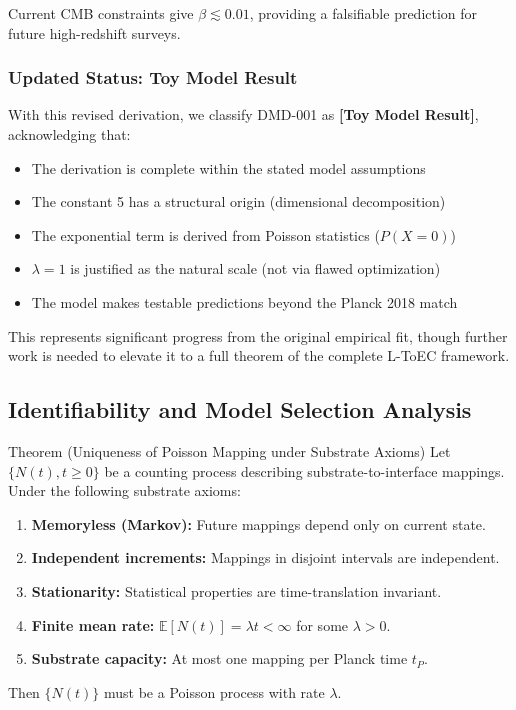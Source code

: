 \documentclass[11pt,titlepage]{article}
\begin{document}
Current CMB constraints give $\beta \lesssim 0.01$, providing a falsifiable prediction for future high-redshift surveys.

\subsubsection{Updated Status: Toy Model Result}
With this revised derivation, we classify DMD-001 as \textbf{[Toy Model Result]}, acknowledging that:
\begin{itemize}
    \item The derivation is complete within the stated model assumptions
    \item The constant 5 has a structural origin (dimensional decomposition)
    \item The exponential term is derived from Poisson statistics ($P(X=0)$)
    \item $\lambda = 1$ is justified as the natural scale (not via flawed optimization)
    \item The model makes testable predictions beyond the Planck 2018 match
\end{itemize}

This represents significant progress from the original empirical fit, though further work is needed to elevate it to a full theorem of the complete L-ToEC framework.


\subsection{Identifiability and Model Selection Analysis}

\begin{mytheorem}{Theorem (Uniqueness of Poisson Mapping under Substrate Axioms)}
\label{thm:poisson-uniqueness}
Let $\{N(t), t \geq 0\}$ be a counting process describing substrate-to-interface mappings. Under the following substrate axioms:
\begin{enumerate}[label=(A\arabic*)]
    \item \textbf{Memoryless (Markov):} Future mappings depend only on current state.
    \item \textbf{Independent increments:} Mappings in disjoint intervals are independent.
    \item \textbf{Stationarity:} Statistical properties are time-translation invariant.
    \item \textbf{Finite mean rate:} $\mathbb{E}[N(t)] = \lambda t < \infty$ for some $\lambda > 0$.
    \item \textbf{Substrate capacity:} At most one mapping per Planck time $t_P$.
\end{enumerate}
Then $\{N(t)\}$ must be a Poisson process with rate $\lambda$.
\end{mytheorem}
\end{document}
